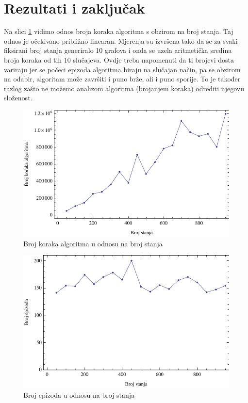 \documentclass[    DIV=calc, paper=a4,fontsize=11pt, twocolumn]{scrartcl}                     %
\begin{document}
\section*{Rezultati i zaključak}
Na slici \ref{fig:3} vidimo odnos broja koraka algoritma s obzirom na broj stanja. Taj odnos je očekivano približno linearan. Mjerenja su izvršena tako da se za svaki fiksirani broj stanja generiralo 10 grafova i onda se uzela aritmetička sredina broja koraka od tih 10 slučajeva. Ovdje treba napomenuti da ti brojevi dosta variraju jer se počeci epizoda algoritma biraju na slučajan način, pa se obzirom na odabir, algoritam može završiti i puno brže, ali i puno sporije. To je također razlog zašto ne možemo analizom algoritma (brojanjem koraka) odrediti njegovu složenost.

\begin{figure}[h!]
\centering
\includegraphics[scale=0.8]{slike/bench1.pdf}
\caption{Broj koraka algoritma u odnosu na broj stanja}
\label{fig:3}
\end{figure}

\begin{figure}[h!]
\centering
\includegraphics[scale=0.8]{slike/bench2.pdf}
\caption{Broj epizoda u odnosu na broj stanja}
\label{fig:4}
\end{figure}
\end{document}
